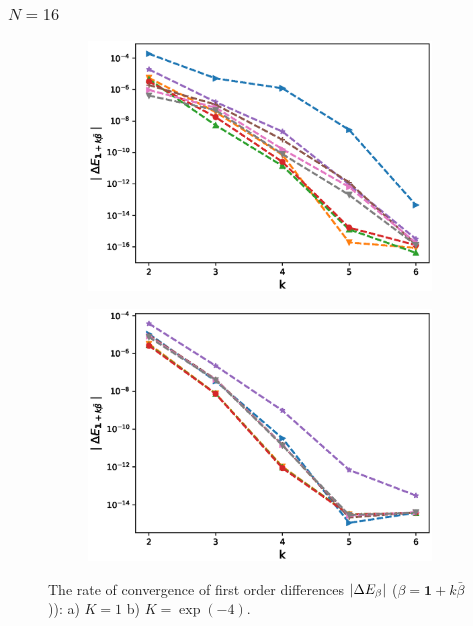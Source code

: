\documentclass[11pt]{article}
\begin{document}
\newpage
\subsubsection*{$N=16$ }
\begin{figure}[h!]
\centering
\begin{subfigure}{.5\textwidth}
\centering
\includegraphics[width=1\linewidth]{./figures/mixed_diff_second_way/H_007/N_16/first_difference_rbergomi_16steps_H_007_K_1.eps}
\caption{}
\label{fig:sub3}
\end{subfigure}%
\begin{subfigure}{.5\textwidth}
\centering
\includegraphics[width=1\linewidth]{./figures/mixed_diff_second_way/H_007/N_16/first_difference_rbergomi_16steps_H_007_K_exp__4.eps}
\caption{}
\label{fig:sub4}
\end{subfigure}

\caption{The rate of convergence of  first order differences $\left\lvert\Delta E_{\beta}\right\rvert$ ($\beta=\mathbf{1}+k \bar{\beta}$)): a) $K=1$ b)  $K=\operatorname{exp}(-4).$}
\label{fig:test2}
\end{figure}
\end{document}
